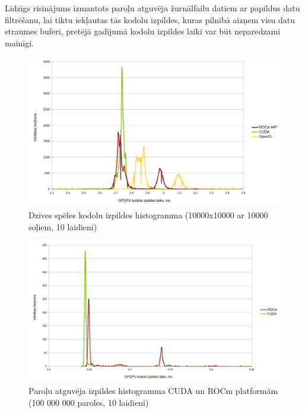Līdzīgs risinājums izmantots paroļu atguvēja žurnālfailu datiem ar papildus
datu filtrēšanu, lai tiktu iekļautas tās kodolu izpildes, kuras pilnībā aizņem
visu datu straumes buferi, pretējā gadījumā kodolu izpildes laiki var būt
neparedzami mainīgi.

\begin{figure}[H]
    \centering
    \includegraphics[width=\textwidth]{images/gol_distrib.png}
    \caption{Dzīves spēles kodolu izpildes histogramma (10000x10000 ar 10000 soļiem, 10 laidieni)}
    \label{img:gol_distrib}
\end{figure}


\begin{figure}[H] \centering
    \includegraphics[width=\textwidth]{images/sha_distrib_cuda_rocm.png}
    \caption{Paroļu atguvēja izpildes histogramma CUDA un ROCm platformām (100
    000 000 paroles, 10 laidieni)} \label{img:sha_distrib}
\end{figure}


